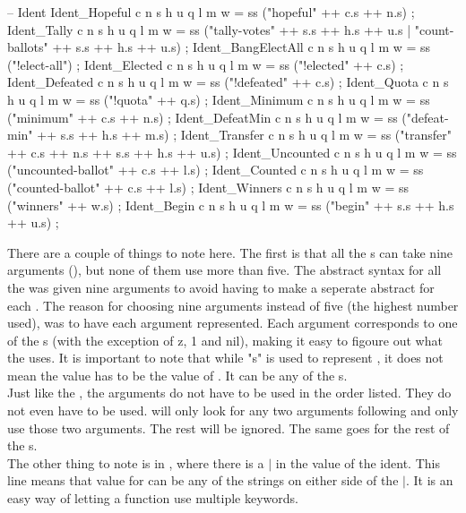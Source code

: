 \begin{lstgf}
        -- Ident
        Ident_Hopeful c n s h u q l m w
            = ss ("hopeful" ++ c.s ++ n.s) ;
        Ident_Tally c n s h u q l m w
            = ss ("tally-votes" ++ s.s ++ h.s ++ u.s | "count-ballots" ++ s.s ++ h.s ++ u.s) ;
        Ident_BangElectAll c n s h u q l m w
            = ss ("!elect-all") ;
        Ident_Elected c n s h u q l m w
            = ss ("!elected" ++ c.s) ;
        Ident_Defeated c n s h u q l m w
            = ss ("!defeated" ++ c.s) ;
        Ident_Quota c n s h u q l m w
            = ss ("!quota" ++ q.s) ;
        Ident_Minimum c n s h u q l m w
            = ss ("minimum" ++ c.s ++ n.s) ;
        Ident_DefeatMin c n s h u q l m w
            = ss ("defeat-min" ++ s.s ++ h.s ++ m.s) ;
        Ident_Transfer c n s h u q l m w
            = ss ("transfer" ++ c.s ++ n.s ++ s.s ++ h.s ++ u.s) ;
        Ident_Uncounted c n s h u q l m w
            = ss ("uncounted-ballot" ++ c.s ++ l.s) ;
        Ident_Counted c n s h u q l m w
            = ss ("counted-ballot" ++ c.s ++ l.s) ;
        Ident_Winners c n s h u q l m w
            = ss ("winners" ++ w.s) ;
        Ident_Begin c n s h u q l m w
            = ss ("begin" ++ s.s ++ h.s ++ u.s) ;
\end{lstgf}
There are a couple of things to note here. The first is that all the s can take nine arguments (), but none of them use more than five. The abstract syntax for all the  was given nine arguments to avoid having to make a seperate abstract for each . The reason for choosing nine arguments instead of five (the highest number used), was to have each argument represented. Each argument corresponds to one of the s (with the exception of z, 1 and nil), making it easy to figoure out what the  uses. It is important to note that while "s" is used to represent , it does not mean the value has to be the value of . It can be any of the s. \\
Just like the , the arguments do not have to be used in the order listed. They do not even have to be used.  will only look for any two arguments following and only use those two arguments. The rest will be ignored. The same goes for the rest of the s. \\
The other thing to note is in , where there is a $|$ in the value of the ident. This line means that value for  can be any of the strings on either side of the $|$. It is an easy way of letting a function use multiple keywords.

